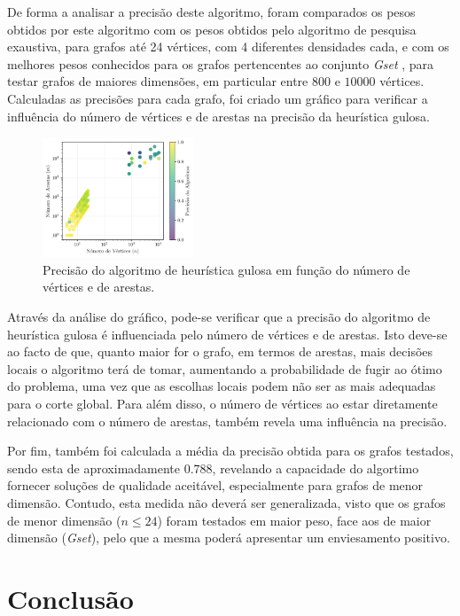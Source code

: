 \documentclass[mirror, portugues]{revdetua}
\begin{document}
De forma a analisar a precisão deste algoritmo, foram comparados os pesos obtidos por este algoritmo com os pesos obtidos pelo algoritmo de pesquisa exaustiva, para grafos até 24 vértices, com 4 diferentes densidades cada, e com os melhores pesos conhecidos para os grafos pertencentes ao conjunto \textit{Gset} \cite{GS24, ME19}, para testar grafos de maiores dimensões, em particular entre $800$ e $10000$ vértices. Calculadas as precisões para cada grafo, foi criado um gráfico para verificar a influência do número de vértices e de arestas na precisão da heurística gulosa.

\begin{figure}[h]
    \centering
    \includegraphics[width=0.4\textwidth]{../assets/precHEU.png}
    \caption{Precisão do algoritmo de heurística gulosa em função do número de vértices e de arestas.}
    \label{fig:precheu}
\end{figure}

Através da análise do gráfico, pode-se verificar que a precisão do algoritmo de heurística gulosa é influenciada pelo número de vértices e de arestas. Isto deve-se ao facto de que, quanto maior for o grafo, em termos de arestas, mais decisões locais o algoritmo terá de tomar, aumentando a probabilidade de fugir ao ótimo do problema, uma vez que as escolhas locais podem não ser as mais adequadas para o corte global. Para além disso, o número de vértices ao estar diretamente relacionado com o número de arestas, também revela uma influência na precisão.

Por fim, também foi calculada a média da precisão obtida para os grafos testados, sendo esta de aproximadamente $0.788$, revelando a capacidade do algortimo fornecer soluções de qualidade aceitável, especialmente para grafos de menor dimensão. Contudo, esta medida não deverá ser generalizada, visto que os grafos de menor dimensão ($n \leq 24$) foram testados em maior peso, face aos de maior dimensão (\textit{Gset}), pelo que a mesma poderá apresentar um enviesamento positivo.

\section{Conclusão}
\end{document}
